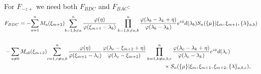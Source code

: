 \documentclass[a4paper,10pt]{article}
\begin{document}
For $F_{-z+}$ we need both $F_{BDC}$ and $F_{BAC}$: 
%
\begin{equation}
\begin{aligned}
&F_{ B  {\color{black}{ D }} {\color{black}{C}} } =
 -{\color{black}{ \sum_{a=1}^n M_a(\xi_{m+2}) }}   {\color{black}{\sum_{b=1,b\neq a}^{n} \frac{\varphi(\eta)}{\varphi(\xi_{m+1}-\lambda_b)} 
\prod_{k=1,k\neq a,b}^{n} \frac{\varphi(\lambda_b-\lambda_k+\eta)}{\varphi(\lambda_b-\lambda_k)} {\color{black} e^{i\phi}}d(\lambda_b) }}
S_n(\{\mu\}|\xi_{m},\xi_{m+1},\{\lambda\}_{a,b})\\
\\
%
&- {\color{black}{ \sum_{a\neq b} M_{ab}(\xi_{m+2})  }} {\color{black}{\sum_{c=1,c\neq a,b}^{n}
% 
\frac{\varphi(\eta)}{\varphi(\xi_{m+1}-\lambda_c)} 
\frac{\varphi(\lambda_c-\xi_{m+2}+\eta)}{\varphi(\lambda_c-\xi_{m+2})} 
%
\prod_{k=1,k\neq a,b,c}^{n} \frac{\varphi(\lambda_c-\lambda_k+\eta)}{\varphi(\lambda_c-\lambda_k)}{\color{black} e^{i\phi}} d(\lambda_c) }} \\
& \hspace*{10cm}
\times
S_n(\{\mu\}|\xi_{m},\xi_{m+1},\xi_{m+2},\{\lambda\}_{a,b,c}),\\
%
\end{aligned}
\end{equation}
\end{document}
